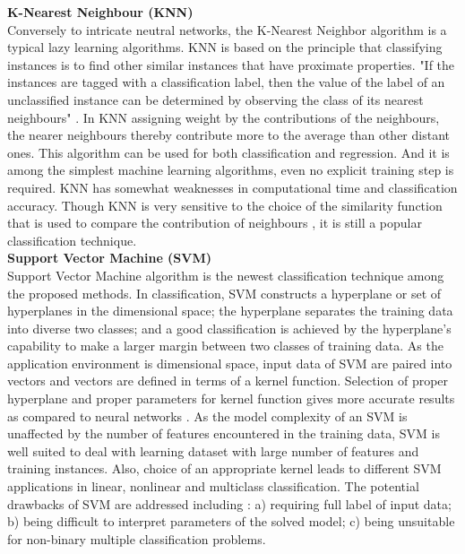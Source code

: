 \documentclass[12pt]{article}
\begin{document}
\textbf{K-Nearest Neighbour (KNN)\\}
Conversely to intricate neutral networks, the K-Nearest Neighbor algorithm is a typical lazy learning algorithms. KNN is based on the principle that classifying instances is to find other similar instances that have proximate properties. "If the instances are tagged with a classification label, then the value of the label of an unclassified instance can be determined by observing the class of its nearest neighbours" \cite{Kotsiantis}.  In KNN assigning weight by the contributions of the neighbours, the nearer neighbours thereby contribute more to the average than other distant ones. This algorithm can be used for both classification and regression. And it is among the simplest machine learning algorithms, even no explicit training step is required. KNN has somewhat weaknesses in computational time and classification accuracy. Though KNN is very sensitive to the choice of the similarity function that is used to compare the contribution of neighbours \cite{Kotsiantis}, it is still a popular classification technique.
\\

\textbf{Support Vector Machine (SVM)\\}
Support Vector Machine algorithm is the newest classification technique among the proposed methods. In classification, SVM constructs a hyperplane or set of hyperplanes in the dimensional space; the hyperplane separates the training data into diverse two classes; and a good classification is achieved by the hyperplane's capability to make a larger margin between two classes of training data. As the application environment is dimensional space, input data of SVM are paired into vectors and vectors are defined in terms of a kernel function. Selection of proper hyperplane and proper parameters for kernel function gives more accurate results as compared to neural networks \cite{Somvanshi}. As the model complexity of an SVM is unaffected by the number of features encountered in the training data, SVM is well suited to deal with learning dataset with large number of features and training instances. Also, choice of an appropriate kernel leads to different SVM applications in linear, nonlinear and multiclass classification. The potential drawbacks of SVM are addressed including \cite{Kotsiantis}: a) requiring full label of input data; b) being difficult to interpret parameters of the solved model; c) being unsuitable for non-binary multiple classification problems.
\\
\end{document}
